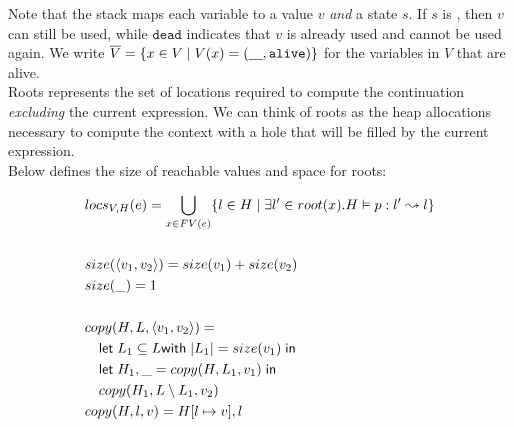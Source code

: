\documentclass[11pt]{article}
\newcommand{\irl}[1]{\mathtt{#1}}
\begin{document}
\noindent
Note that the stack maps each variable to a value $v$ \emph{and} a state $s$. If $s$ is \irl{alive}, then $v$ can still be used, while $\irl{dead}$ indicates that $v$ is already used and cannot be used again. We write $\overline V = \{x \in V \mid V(x) = (\underline{\hspace{10px}},\irl{alive}) \}$ for the variables in $V$ that are alive.\\ 

\noindent
Roots represents the set of locations required to compute the continuation \emph{excluding} the current expression.
We can think of roots as the heap allocations necessary to compute the context with a hole that will be filled
by the current expression.\\


\noindent
Below defines the size of reachable values and space for roots:

\begin{align*}
  &locs_{V,H}(e) = \bigcup\limits_{x \in FV(e)} \{l \in H \mid \exists l' \in root(x). H \vDash p : l' \leadsto l\}\\\\
  &size(\langle v_1, v_2\rangle) = size(v_1) + size(v_2)\\
  &size(\_) = 1\\\\
  &copy(H,L,\langle v_1, v_2\rangle) =\\
  &\quad\mathsf{let }\; L_1 \subseteq L \mathsf{ with }\; |L_1| = size(v_1) \;\mathsf{ in}\\
  &\quad\mathsf{let }\; H_1,\_ = copy(H,L_1,v_1) \;\mathsf{ in} \\
  &\quad copy(H_1,L \setminus L_1, v_2)\\
  &copy(H,l,v) = H[l \mapsto v], l\\
\end{align*}
\end{document}
